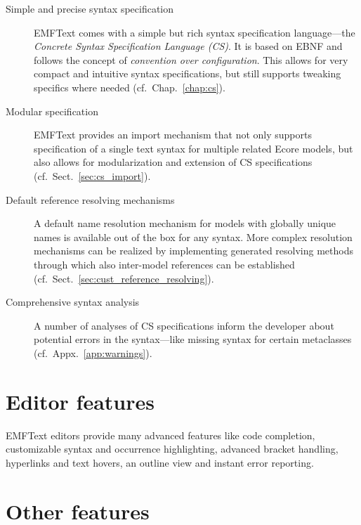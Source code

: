 \begin{description}

  \item[Simple and precise syntax specification]
        EMFText comes with a simple but rich syntax specification language---the
        \emph{Concrete Syntax Specification Language (CS)}. It is based on EBNF 
        and follows the concept of \emph{convention over configuration}. This 
        allows for very compact and intuitive syntax specifications, but still 
        supports tweaking specifics where needed (cf.~Chap.~\ref{chap:cs}).

  \item[Modular specification]
        EMFText provides an import mechanism that not only supports specification 
        of a single text syntax for multiple related Ecore models, but also allows 
        for modularization and extension of CS specifications (cf.~Sect.~\ref{sec:cs_import}).

  \item[Default reference resolving mechanisms]
        A default name resolution mechanism for models with globally unique 
        names is available out of the box for any syntax. More complex resolution 
        mechanisms can be realized by implementing generated resolving methods 
        through which also inter-model references can be established 
        (cf.~Sect.~\ref{sec:cust_reference_resolving}).

  \item[Comprehensive syntax analysis]
        A number of analyses of CS specifications inform the developer about 
        potential errors in the syntax---like missing syntax for certain 
        metaclasses (cf.~Appx.~\ref{app:warnings}).

\end{description}


\section{Editor features}

EMFText editors provide many advanced features like code completion, 
customizable syntax and occurrence highlighting, advanced bracket handling,
hyperlinks and text hovers, an outline view and instant error reporting.


\section{Other features}

